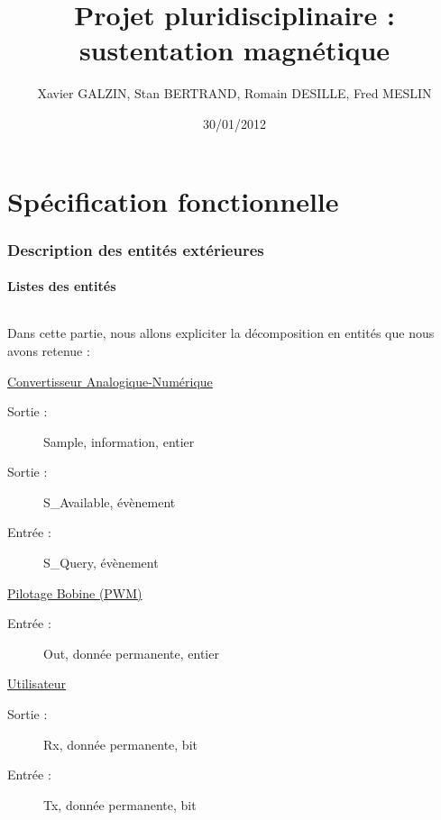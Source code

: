 \documentclass[11pt, french]{article} %
\title{Projet pluridisciplinaire : sustentation magnétique}
\author{ Xavier GALZIN, Stan BERTRAND, Romain DESILLE, Fred MESLIN}
\date{30/01/2012}
\begin{document}
\maketitle
\pagebreak


\part{Spécification fonctionnelle}

\section{Description des entités extérieures}

\subsection{Listes des entités}

\paragraph{} Dans cette partie, nous allons expliciter la décomposition en entités que nous avons retenue :

\vspace{0.2in}
\hspace{0.2in}
\underline{Convertisseur Analogique-Numérique}
\begin{description}
\item[Sortie :] Sample, information, entier
\item[Sortie :] S\_Available, évènement
\item[Entrée :] S\_Query, évènement
\end{description}

\vspace{0.2in}
\hspace{0.2in}
\underline{Pilotage Bobine (PWM)}
\begin{description}
\item[Entrée : ] Out, donnée permanente, entier
\end{description}

\vspace{0.2in}
\hspace{0.2in}
\underline{Utilisateur}   
\begin{description}
\item[Sortie : ] Rx, donnée permanente, bit
\item[Entrée : ] Tx, donnée permanente, bit
\end{description}
\end{document}
